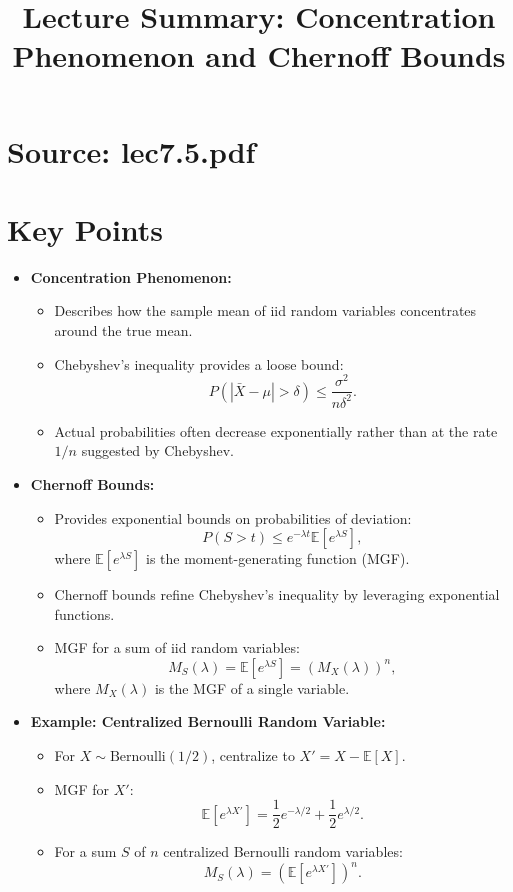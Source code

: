 \documentclass{article}
\title{Lecture Summary: Concentration Phenomenon and Chernoff Bounds}
\author{}
\date{}
\begin{document}
\maketitle

\section*{Source: lec7.5.pdf}

\section*{Key Points}

\begin{itemize}
  \item \textbf{Concentration Phenomenon:}
    \begin{itemize}
      \item Describes how the sample mean of iid random variables concentrates around the true mean.
      \item Chebyshev's inequality provides a loose bound:
        \[
          P(|\bar{X} - \mu| > \delta) \leq \frac{\sigma^2}{n \delta^2}.
        \]
      \item Actual probabilities often decrease exponentially rather than at the rate $1/n$ suggested by Chebyshev.
    \end{itemize}

  \item \textbf{Chernoff Bounds:}
    \begin{itemize}
      \item Provides exponential bounds on probabilities of deviation:
        \[
          P(S > t) \leq e^{-\lambda t} \mathbb{E}[e^{\lambda S}],
        \]
        where $\mathbb{E}[e^{\lambda S}]$ is the moment-generating function (MGF).
      \item Chernoff bounds refine Chebyshev's inequality by leveraging exponential functions.
      \item MGF for a sum of iid random variables:
        \[
          M_S(\lambda) = \mathbb{E}[e^{\lambda S}] = \left(M_X(\lambda)\right)^n,
        \]
        where $M_X(\lambda)$ is the MGF of a single variable.
    \end{itemize}

  \item \textbf{Example: Centralized Bernoulli Random Variable:}
    \begin{itemize}
      \item For $X \sim \text{Bernoulli}(1/2)$, centralize to $X' = X - \mathbb{E}[X]$.
      \item MGF for $X'$:
        \[
          \mathbb{E}[e^{\lambda X'}] = \frac{1}{2} e^{-\lambda/2} + \frac{1}{2} e^{\lambda/2}.
        \]
      \item For a sum $S$ of $n$ centralized Bernoulli random variables:
        \[
          M_S(\lambda) = \left(\mathbb{E}[e^{\lambda X'}]\right)^n.
        \]
    \end{itemize}


\end{itemize}
\end{document}
